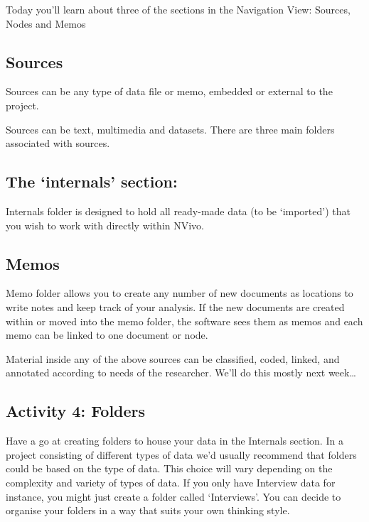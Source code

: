 \documentclass[]{book}
\theoremstyle{definition}
\theoremstyle{definition}
\theoremstyle{definition}
\theoremstyle{remark}
\begin{document}
Today you'll learn about three of the sections in the Navigation View:
Sources, Nodes and Memos

\hypertarget{sources}{%
\subsection{Sources}\label{sources}}

Sources can be any type of data file or memo, embedded or external to
the project.

Sources can be text, multimedia and datasets. There are three main
folders associated with sources.

\hypertarget{the-internals-section}{%
\subsection{The `internals' section:}\label{the-internals-section}}

Internals folder is designed to hold all ready-made data (to be
`imported') that you wish to work with directly within NVivo.

\hypertarget{memos}{%
\subsection{Memos}\label{memos}}

Memo folder allows you to create any number of new documents as
locations to write notes and keep track of your analysis. If the new
documents are created within or moved into the memo folder, the software
sees them as memos and each memo can be linked to one document or node.

Material inside any of the above sources can be classified, coded,
linked, and annotated according to needs of the researcher. We'll do
this mostly next week\ldots{}

\hypertarget{activity-4-folders}{%
\subsection{Activity 4: Folders}\label{activity-4-folders}}

Have a go at creating folders to house your data in the Internals
section. In a project consisting of different types of data we'd usually
recommend that folders could be based on the type of data. This choice
will vary depending on the complexity and variety of types of data. If
you only have Interview data for instance, you might just create a
folder called `Interviews'. You can decide to organise your folders in a
way that suits your own thinking style.
\end{document}
